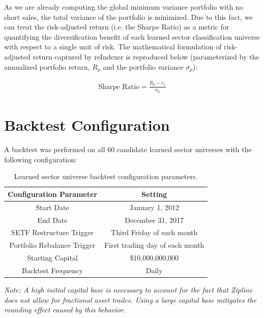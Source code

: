 \documentclass[../main.tex]{subfiles}
\begin{document}
As we are already computing the global minimum variance portfolio with no short sales, the total variance of the portfolio is minimized. Due to this fact, we can treat the risk-adjusted return (i.e. the Sharpe Ratio) as a metric for quantifying the diversification benefit of each learned sector classification universe with respect to a single unit of risk. The mathematical formulation of risk-adjusted return captured by reIndexer is reproduced below (parameterized by the annualized portfolio return, $R_p$ and the portfolio variance $\sigma_p$):

\begin{gather*}
    \text{Sharpe Ratio} = \frac{R_p - r_f}{\sigma_p}
\end{gather*}


\section{Backtest Configuration} \label{candidate_universe_ranking:backtest_config}

A backtest was performed on all 60 candidate learned sector universes with the following configuration:

\begin{table}[h!]
    \centering
    \begin{tabular}{|c|c|}
        \hline
        \textbf{Configuration Parameter} & \textbf{Setting} \\
        \hline
        Start Date & January 1, 2012 \\
        End Date & December 31, 2017 \\
        SETF Restructure Trigger & Third Friday of each month \\
        Portfolio Rebalance Trigger & First trading day of each month \\
        Starting Capital & \$10,000,000,000 \\
        Backtest Frequency & Daily \\
        \hline
    \end{tabular}
    \caption{Learned sector universe backtest configuration parameters.}
    \label{table:candidate_universe_ranking:backtest_configuration}
\end{table}

\textit{Note: A high initial capital base is necessary to account for the fact that Zipline does not allow for fractional asset trades. Using a large capital base mitigates the rounding effect caused by this behavior.}
\end{document}
